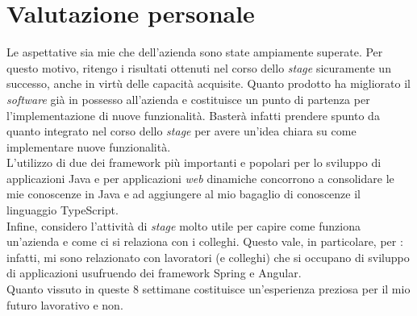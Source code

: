 \section{Valutazione personale}
Le aspettative sia mie che dell'azienda sono state ampiamente superate. Per
questo motivo, ritengo i risultati ottenuti nel corso dello \textit{stage}
sicuramente un successo, anche in virtù delle capacità acquisite. Quanto
prodotto ha migliorato il \textit{software} già in possesso all'azienda
e costituisce un punto di partenza per l'implementazione di nuove funzionalità.
Basterà infatti prendere spunto da quanto integrato nel corso dello
\textit{stage} per avere un'idea chiara su come implementare nuove
funzionalità. \\
L'utilizzo di due dei \gls{framework} più importanti e popolari per lo sviluppo
di applicazioni Java e per applicazioni \textit{web} dinamiche concorrono a
consolidare le mie conoscenze in Java e ad aggiungere al mio bagaglio di
conoscenze il linguaggio TypeScript.  \\
Infine, considero l'attività di \textit{stage} molto utile per capire come
funziona un'azienda e come ci si relaziona con i colleghi. Questo vale, in
particolare, per \myCompany: infatti, mi sono relazionato con lavoratori (e
colleghi) che si occupano di sviluppo di applicazioni usufruendo dei
\gls{framework} Spring e Angular.\\
Quanto vissuto in queste 8 settimane costituisce un'esperienza
preziosa per il mio futuro lavorativo e non.